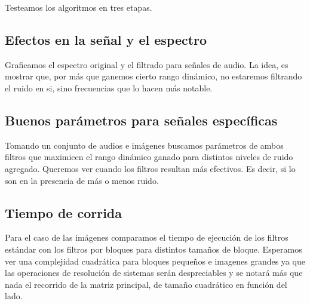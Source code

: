 \PARstart Testeamos los algoritmos en tres etapas.

\subsection{Efectos en la se\~nal y el espectro}

Graficamos el espectro original y el filtrado para se\~nales
de audio.
La idea, es mostrar que, por m\'as que ganemos
cierto rango din\'amico, no estaremos filtrando el ruido en
si, sino frecuencias que lo hacen m\'as notable.

\subsection{Buenos par\'ametros para se\~nales espec\'ificas}

Tomando un conjunto de audios e im\'agenes buscamos par\'ametros
de ambos filtros que maximicen el rango din\'amico ganado para
distintos niveles de ruido agregado.
Queremos ver cuando los filtros resultan m\'as efectivos.
Es decir, si lo son en la presencia de m\'as o menos ruido.

\subsection{Tiempo de corrida}

Para el caso de las im\'agenes comparamos el tiempo de ejecuci\'on
de los filtros est\'andar con los filtros por bloques para
distintos tama\~nos de bloque. Esperamos ver una complejidad
cuadr\'atica para bloques peque\~nos e imagenes grandes
ya que las operaciones de resoluci\'on de sistemas ser\'an
despreciables y se notar\'a m\'as que nada el recorrido de la matriz
principal, de tama\~no cuadr\'atico en funci\'on del lado.
